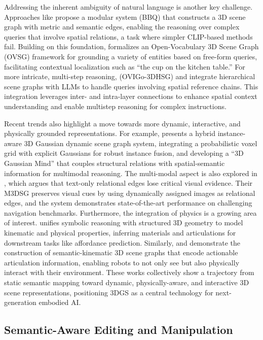 \documentclass[11pt]{article}
\begin{document}
Addressing the inherent ambiguity of natural language is another key challenge. Approaches like \cite{ref529} propose a modular system (BBQ) that constructs a 3D scene graph with metric and semantic edges, enabling the reasoning over complex queries that involve spatial relations, a task where simpler CLIP-based methods fail. Building on this foundation, \cite{ref530} formalizes an Open-Vocabulary 3D Scene Graph (OVSG) framework for grounding a variety of entities based on free-form queries, facilitating contextual localization such as ``the cup on the kitchen table.'' For more intricate, multi-step reasoning, \cite{ref531} (OVIGo-3DHSG) and \cite{ref532} integrate hierarchical scene graphs with LLMs to handle queries involving spatial reference chains. This integration leverages inter- and intra-layer connections to enhance spatial context understanding and enable multistep reasoning for complex instructions.

Recent trends also highlight a move towards more dynamic, interactive, and physically grounded representations. For example, \cite{ref533} presents a hybrid instance-aware 3D Gaussian dynamic scene graph system, integrating a probabilistic voxel grid with explicit Gaussians for robust instance fusion, and developing a ``3D Gaussian Mind'' that couples structural relations with spatial-semantic information for multimodal reasoning. The multi-modal aspect is also explored in \cite{ref534}, which argues that text-only relational edges lose critical visual evidence. Their M3DSG preserves visual cues by using dynamically assigned images as relational edges, and the system demonstrates state-of-the-art performance on challenging navigation benchmarks. Furthermore, the integration of physics is a growing area of interest. \cite{ref535} unifies symbolic reasoning with structured 3D geometry to model kinematic and physical properties, inferring materials and articulations for downstream tasks like affordance prediction. Similarly, \cite{ref536} and \cite{ref537} demonstrate the construction of semantic-kinematic 3D scene graphs that encode actionable articulation information, enabling robots to not only see but also physically interact with their environment. These works collectively show a trajectory from static semantic mapping toward dynamic, physically-aware, and interactive 3D scene representations, positioning 3DGS as a central technology for next-generation embodied AI.

\subsection{Semantic-Aware Editing and Manipulation}
\end{document}
